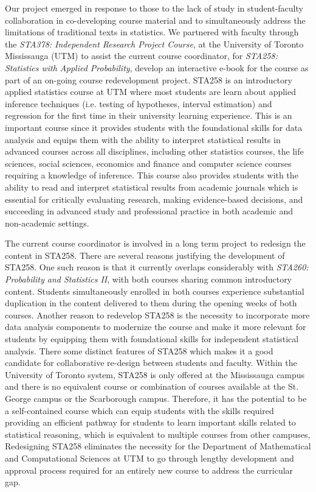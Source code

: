 \documentclass[11pt]{article}
\begin{document}
Our project emerged in response to those to the lack of study in student-faculty collaboration in co-developing course material and to simultaneously address the limitations of traditional texts in statistics. 
We partnered with faculty through the \textit{STA378: Independent Research Project Course}, at the University of Toronto Mississauga (UTM) to assist the current course coordinator, for \textit{STA258: Statistics with Applied Probability}, develop an interactive e-book for the course as part of an on-going course redevelopment project.
STA258 is an introductory applied statistics course at UTM where most students are learn about applied inference techniques (i.e. testing of hypotheses, interval estimation) and regression for the first time in their university learning experience.
This is an important course since it provides students with the foundational skills for data analysis and equips them with the ability to interpret statistical results in advanced courses across all disciplines, including other statistics courses, the life sciences, social sciences, economics and finance and computer science courses requiring a knowledge of inference.
This course also provides students with the ability to read and interpret statistical results from academic journals which is essential for critically evaluating research, making evidence-based decisions, and succeeding in advanced study and professional practice in both academic and non-academic settings.

The current course coordinator is involved in a long term project to redesign the content in STA258. 
There are several reasons justifying the development of STA258.
One such reason is that it currently overlaps considerably with \textit{STA260: Probability and Statistics II}, with both courses sharing common introductory content.
Students simultaneously enrolled in both courses experience substantial duplication in the content delivered to them during the opening weeks of both courses.
Another reason to redevelop STA258 is the necessity to incorporate more data analysis components to modernize the course and make it more relevant for students by equipping them with foundational skills for independent statistical analysis.
There some distinct features of STA258 which makes it a good candidate for collaborative re-design between students and faculty.
Within the University of Toronto system, STA258 is only offered at the Mississauga campus and there is no equivalent course or combination of courses available at the St. George campus or the Scarborough campus.
Therefore, it has the potential to be a self-contained course which can equip students with the skills required providing an efficient pathway for students to learn important skills related to statistical reasoning, which is equivalent to multiple courses from other campuses, 
Redesigning STA258 eliminates the necessity for the Department of Mathematical and Computational Sciences at UTM to go through lengthy development and approval process required for an entirely new course to address the curricular gap.
\end{document}
